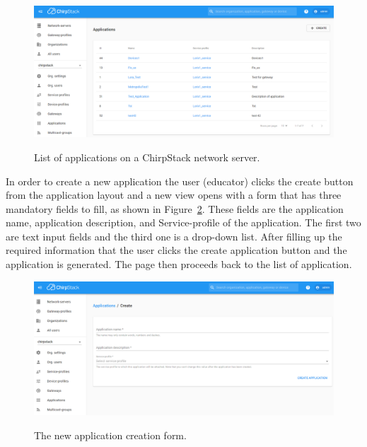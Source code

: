 \begin{figure}[ht]
  \centering
  {\includegraphics[width=\textwidth]{illustration/ChirpStack_application_list.png}}
  \caption{List of applications on a ChirpStack network server.}
  \label{fig:ChirpStack_application_list}
\end{figure}

In order to create a new application the user (educator) clicks the create button from the application layout and a new view opens with a form that has three mandatory fields to fill, as shown in Figure~\ref{fig:ChirpStack_new_application}.
These fields are the application name, application description, and Service-profile of the application.
The first two are text input fields and the third one is a drop-down list.
After filling up the required information that the user clicks the create application button and the application is generated.
The page then proceeds back to the list of application.

\begin{figure}[ht]
  \centering
  {\includegraphics[width=\textwidth]{illustration/ChirpStack_new_application.png}}
  \caption{The new application creation form.}
  \label{fig:ChirpStack_new_application}
\end{figure}

